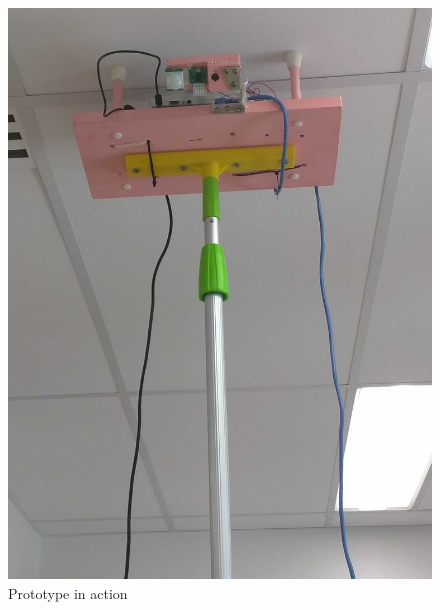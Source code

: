 \begin{figure}[H]
\centering
\includegraphics[height=0.5\textheight]{../diagrams/prototype-mounted-ceiling.jpg}
\caption{Prototype in action}
\label{fig:pictures:protoact}
\end{figure}

